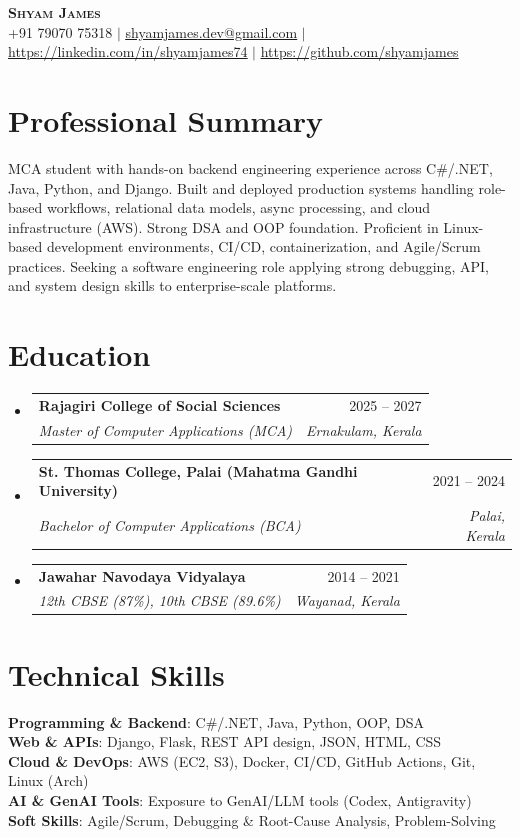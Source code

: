 \documentclass[a4paper,11pt]{article}
\makeatletter
\newcommand{\resumeSubheading}[4]{
  \vspace{-2pt}\item
    \begin{tabular*}{0.97\textwidth}[t]{l@{\extracolsep{\fill}}r}
      \textbf{#1} & #2 \\
      \textit{\small#3} & \textit{\small #4} \\
    \end{tabular*}\vspace{-7pt}
}
\newcommand{\resumeSubHeadingListStart}{\begin{itemize}[leftmargin=0.15in, label={}]}
\newcommand{\resumeSubHeadingListEnd}{\end{itemize}}
\makeatother
\begin{document}
\begin{center}
    \textbf{\Huge \scshape Shyam James} \\ \vspace{5pt}
    \small +91 79070 75318 $|$ \href{mailto:shyamjames.dev@gmail.com}{\underline{shyamjames.dev@gmail.com}} $|$ 
    \href{https://linkedin.com/in/shyamjames74}{\underline{https://linkedin.com/in/shyamjames74}} $|$
    \href{https://github.com/shyamjames}{\underline{https://github.com/shyamjames}}
\end{center}

\section{Professional Summary}
\vspace{2pt}
\small{MCA student with hands-on backend engineering experience across C\#/.NET, Java, Python, and Django. Built and deployed production systems handling role-based workflows, relational data models, async processing, and cloud infrastructure (AWS). Strong DSA and OOP foundation. Proficient in Linux-based development environments, CI/CD, containerization, and Agile/Scrum practices. Seeking a software engineering role applying strong debugging, API, and system design skills to enterprise-scale platforms.}

\section{Education}
  \resumeSubHeadingListStart
    \resumeSubheading
      {Rajagiri College of Social Sciences}{2025 -- 2027}
      {Master of Computer Applications (MCA)}{Ernakulam, Kerala}
    \resumeSubheading
      {St. Thomas College, Palai (Mahatma Gandhi University)}{2021 -- 2024}
      {Bachelor of Computer Applications (BCA)}{Palai, Kerala}
    \resumeSubheading
      {Jawahar Navodaya Vidyalaya}{2014 -- 2021}
      {12th CBSE (87\%), 10th CBSE (89.6\%)}{Wayanad, Kerala}
  \resumeSubHeadingListEnd

\section{Technical Skills}
 \begin{itemize}[leftmargin=0.15in, label={}]
    \small{\item{
     \textbf{Programming \& Backend}{: C\#/.NET, Java, Python, OOP, DSA} \\
     \textbf{Web \& APIs}{: Django, Flask, REST API design, JSON, HTML, CSS} \\
     \textbf{Cloud \& DevOps}{: AWS (EC2, S3), Docker, CI/CD, GitHub Actions, Git, Linux (Arch)} \\
     \textbf{AI \& GenAI Tools}{: Exposure to GenAI/LLM tools (Codex, Antigravity)} \\
     \textbf{Soft Skills}{: Agile/Scrum, Debugging \& Root-Cause Analysis, Problem-Solving} \\
    }}
 \end{itemize}
\end{document}

